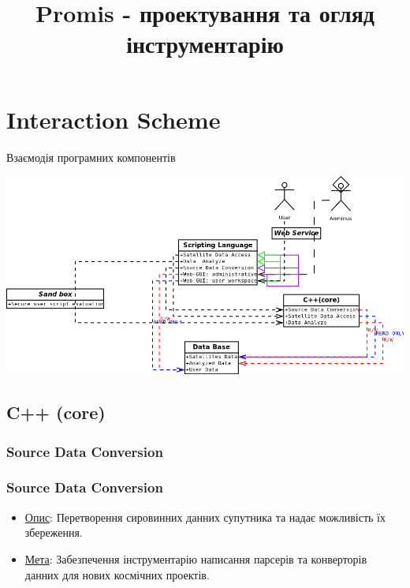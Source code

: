 \documentclass[final,12pt,aspectratio=43]{beamer}
\title{Promis - проектування та огляд інструментарію}
\begin{document}

\begin{frame}
	\titlepage
\end{frame}

\section{Interaction Scheme}
\begin{frame}
    \begin{center}
        \huge \ttfamily Взаємодія програмних компонентів
    \end{center}
\end{frame}

\begin{frame}
    \includegraphics[height=0.50\textwidth]{presentation_1_scheme_1.png}
\end{frame}

\subsection{C++ (core)}
\subsubsection{Source Data Conversion}
\begin{frame}
    \frametitle{Source Data Conversion}
    \begin{itemize}
        \item \colorbox{light-blue}{\underline{Опис}:} Перетворення сировинних данних супутника та надає можливість їх збереження.
        \item \colorbox{light-blue}{\underline{Мета}:} Забезпечення інструментарію написання парсерів та конверторів данних для нових космічних проектів.
    \end{itemize}
\end{frame}
\end{document}
